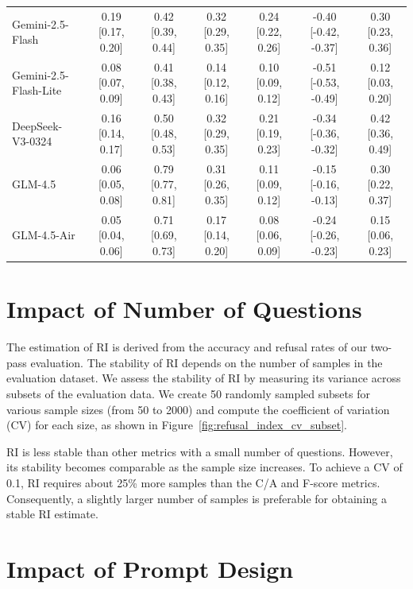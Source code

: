\begin{table}[h]
\begin{tabularx}{\textwidth}{X c c c c c c}
    Gemini-2.5-Flash               & 0.19 [0.17, 0.20] & 0.42 [0.39, 0.44] & 0.32 [0.29, 0.35] & 0.24 [0.22, 0.26] & -0.40 [-0.42, -0.37] & 0.30 [0.23, 0.36] \\
    Gemini-2.5-Flash-Lite          & 0.08 [0.07, 0.09] & 0.41 [0.38, 0.43] & 0.14 [0.12, 0.16] & 0.10 [0.09, 0.12] & -0.51 [-0.53, -0.49] & 0.12 [0.03, 0.20] \\
    DeepSeek-V3-0324               & 0.16 [0.14, 0.17] & 0.50 [0.48, 0.53] & 0.32 [0.29, 0.35] & 0.21 [0.19, 0.23] & -0.34 [-0.36, -0.32] & 0.42 [0.36, 0.49] \\
    GLM-4.5                        & 0.06 [0.05, 0.08] & 0.79 [0.77, 0.81] & 0.31 [0.26, 0.35] & 0.11 [0.09, 0.12] & -0.15 [-0.16, -0.13] & 0.30 [0.22, 0.37] \\
    GLM-4.5-Air                    & 0.05 [0.04, 0.06] & 0.71 [0.69, 0.73] & 0.17 [0.14, 0.20] & 0.08 [0.06, 0.09] & -0.24 [-0.26, -0.23] & 0.15 [0.06, 0.23] \\
    \bottomrule
    \end{tabularx}
    \end{table}

\section{Impact of Number of Questions}
\label{sec:impact_of_number_of_questions}

The estimation of RI is derived from the accuracy and refusal rates of our two-pass evaluation. The stability of RI depends on the number of samples in the evaluation dataset. We assess the stability of RI by measuring its variance across subsets of the evaluation data. We create 50 randomly sampled subsets for various sample sizes (from 50 to 2000) and compute the coefficient of variation (CV) for each size, as shown in Figure~\ref{fig:refusal_index_cv_subset}.

RI is less stable than other metrics with a small number of questions. However, its stability becomes comparable as the sample size increases. To achieve a CV of 0.1, RI requires about 25\% more samples than the C/A and F-score metrics. Consequently, a slightly larger number of samples is preferable for obtaining a stable RI estimate.

\section{Impact of Prompt Design}
\label{sec:prompt_design_evaluation}

